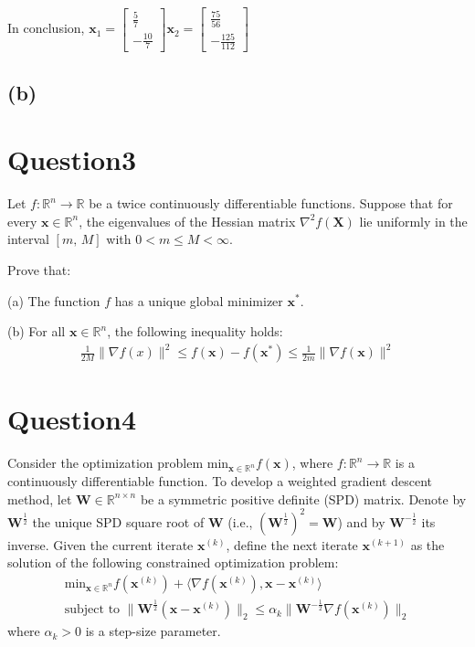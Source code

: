 \documentclass{article}
\newcommand{\R}{\mathbb{R}}
\begin{document}
In conclusion, \(\bm{x}_1 = \begin{bmatrix}
    \frac{5}{7} \\
    -\frac{10}{7}
\end{bmatrix} \bm{x}_2 = \begin{bmatrix}
    \frac{75}{56} \\
    -\frac{125}{112}
\end{bmatrix}\)

\subsection*{(b)}



\section*{Question3}
Let \(f: \R^n \to \R\) be a twice continuously differentiable functions. Suppose that for every \(\bm{x} \in \R^n\), the eigenvalues of the Hessian matrix \(\nabla^2 f(\bm{X})\) lie uniformly in the interval \([\textit{m, M}]\) with \(0 < m \leq M < \infty\).

Prove that:

(a) The function \(f\) has a unique global minimizer \(\bm{x}^{*}\).

(b) For all \(\bm{x} \in \R^n\), the following inequality holds:
\begin{align*}
    \frac{1}{2M} \|\nabla f(x)\|^2 \leq f(\bm{x}) - f(\bm{x}^*) \leq \frac{1}{2m} \|\nabla f(\bm{x})\|^2
\end{align*}

\section*{Question4}
Consider the optimization problem \(\text{min}_{\bm{x} \in \R^n} f(\bm{x})\), where \(f: \R^n \to \R\) is a continuously differentiable function. To develop a weighted gradient descent method, let \(\bm{W} \in \R^{n \times n}\) be a symmetric positive definite (SPD) matrix. Denote by \(\bm{W}^{\frac{1}{2}}\) the unique SPD square root of \(\bm{W}\) (i.e., \((\bm{W}^{\frac{1}{2}})^2 = \bm{W}\)) and by \(\bm{W}^{-\frac{1}{2}}\) its inverse. Given the current iterate \(\bm{x}^{(k)}\), define the next iterate \(\bm{x}^{(k + 1)}\) as the solution of the following constrained optimization problem:
\begin{align*}
    \text{min}_{\bm{x} \in \R^n}f(\bm{x}^{(k)}) + \langle \nabla f(\bm{x}^{(k)}), \bm{x} - \bm{x}^{(k)}\rangle \\
    \text{subject to } \|\bm{W}^{\frac{1}{2}} (\bm{x} - \bm{x}^(k))\|_2 \leq \alpha_k\|\bm{W}^{-\frac{1}{2}} \nabla f(\bm{x}^(k))\|_2
\end{align*}
where  \(\alpha_k > 0\) is a step-size parameter.
\end{document}
